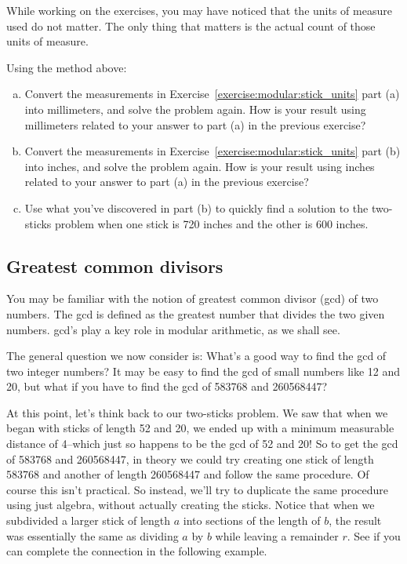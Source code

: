 While working on the exercises, you may have noticed that the units of measure used do not matter.  The only thing that matters is the actual count of those units of measure.  

\begin{exercise}{}
Using the method above:
\begin{enumerate}[(a)]
\item
Convert the measurements in Exercise~\ref{exercise:modular:stick_units} part (a) into millimeters, and solve the problem again. How is your result using millimeters related to your answer to part (a) in the previous exercise?
\item
Convert the measurements in Exercise~\ref{exercise:modular:stick_units} part (b) into inches, and solve the problem again. How is your result using inches related to your answer to part (a) in the previous exercise?
\item
Use what you've discovered in part (b) to quickly find a solution to the two-sticks problem when one stick is 720 inches and the other is 600 inches.
\end{enumerate}
\end{exercise}

\subsection{Greatest common divisors}
You may be  familiar with the notion of greatest common divisor (gcd) of two numbers.  The gcd is defined as the greatest number that divides the two given numbers. gcd's play a key role in modular arithmetic, as we shall see. 

The general question we now consider is: What's a good way to find the gcd of two integer numbers? It may be easy to find the gcd of small numbers like 12 and 20, but what if you have to find the gcd of 583768 and 260568447? 

At this point, let's think back to our two-sticks problem. We saw that when we began with sticks of length 52 and 20, we ended up with a minimum measurable distance of 4--which just so happens to be the gcd of 52 and 20! So to get the gcd of 583768 and 260568447, in theory we could try creating one stick of length 583768 and another of length 260568447 and follow the same procedure. Of course this isn't practical. So instead, we'll try to duplicate the same procedure using just algebra, without actually creating the sticks.  Notice that when we subdivided a larger stick of length $a$ into sections of the length of $b$, the result was essentially the same as dividing $a$ by $b$ while leaving a remainder $r$.  See if you can complete the connection in the following example.

